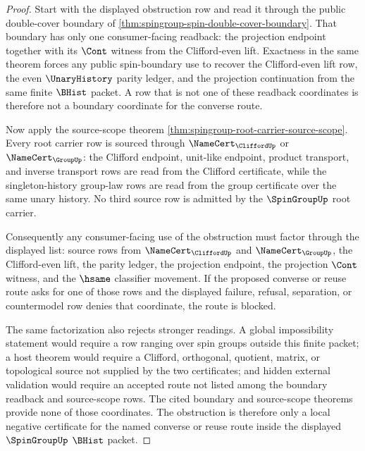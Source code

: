 \begin{proof}
Start with the displayed obstruction row and read it through the public double-cover boundary of \autoref{thm:spingroup-spin-double-cover-boundary}. That boundary has only one consumer-facing readback: the projection endpoint together with its $\Cont$ witness from the Clifford-even lift. Exactness in the same theorem forces any public spin-boundary use to recover the Clifford-even lift row, the even $\UnaryHistory$ parity ledger, and the projection continuation from the same finite $\BHist$ packet. A row that is not one of these readback coordinates is therefore not a boundary coordinate for the converse route.

Now apply the source-scope theorem \autoref{thm:spingroup-root-carrier-source-scope}. Every root carrier row is sourced through $\NameCert_{\CliffordUp}$ or $\NameCert_{\GroupUp}$: the Clifford endpoint, unit-like endpoint, product transport, and inverse transport rows are read from the Clifford certificate, while the singleton-history group-law rows are read from the group certificate over the same unary history. No third source row is admitted by the $\SpinGroupUp$ root carrier.

Consequently any consumer-facing use of the obstruction must factor through the displayed list: source rows from $\NameCert_{\CliffordUp}$ and $\NameCert_{\GroupUp}$, the Clifford-even lift, the parity ledger, the projection endpoint, the projection $\Cont$ witness, and the $\hsame$ classifier movement. If the proposed converse or reuse route asks for one of those rows and the displayed failure, refusal, separation, or countermodel row denies that coordinate, the route is blocked.

The same factorization also rejects stronger readings. A global impossibility statement would require a row ranging over spin groups outside this finite packet; a host theorem would require a Clifford, orthogonal, quotient, matrix, or topological source not supplied by the two certificates; and hidden external validation would require an accepted route not listed among the boundary readback and source-scope rows. The cited boundary and source-scope theorems provide none of those coordinates. The obstruction is therefore only a local negative certificate for the named converse or reuse route inside the displayed $\SpinGroupUp$ $\BHist$ packet.
\end{proof}
